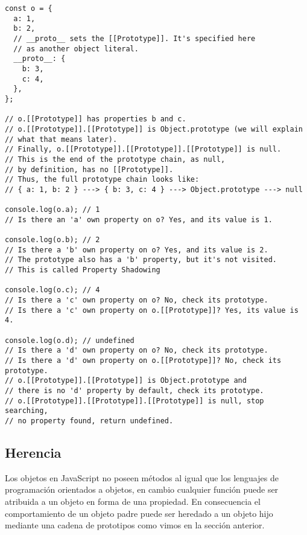 \documentclass{article}
\begin{document}
\begin{lstlisting}
const o = {
  a: 1,
  b: 2,
  // __proto__ sets the [[Prototype]]. It's specified here
  // as another object literal.
  __proto__: {
    b: 3,
    c: 4,
  },
};

// o.[[Prototype]] has properties b and c.
// o.[[Prototype]].[[Prototype]] is Object.prototype (we will explain
// what that means later).
// Finally, o.[[Prototype]].[[Prototype]].[[Prototype]] is null.
// This is the end of the prototype chain, as null,
// by definition, has no [[Prototype]].
// Thus, the full prototype chain looks like:
// { a: 1, b: 2 } ---> { b: 3, c: 4 } ---> Object.prototype ---> null

console.log(o.a); // 1
// Is there an 'a' own property on o? Yes, and its value is 1.

console.log(o.b); // 2
// Is there a 'b' own property on o? Yes, and its value is 2.
// The prototype also has a 'b' property, but it's not visited.
// This is called Property Shadowing

console.log(o.c); // 4
// Is there a 'c' own property on o? No, check its prototype.
// Is there a 'c' own property on o.[[Prototype]]? Yes, its value is 4.

console.log(o.d); // undefined
// Is there a 'd' own property on o? No, check its prototype.
// Is there a 'd' own property on o.[[Prototype]]? No, check its prototype.
// o.[[Prototype]].[[Prototype]] is Object.prototype and
// there is no 'd' property by default, check its prototype.
// o.[[Prototype]].[[Prototype]].[[Prototype]] is null, stop searching,
// no property found, return undefined.

\end{lstlisting}

\subsection*{Herencia}

Los objetos en JavaScript no poseen métodos al igual que los lenguajes de programación orientados  a objetos,
en cambio cualquier función puede ser atribuida a un objeto en forma de una propiedad. En consecuencia el
comportamiento de un objeto padre puede ser heredado a un objeto hijo mediante una cadena de prototipos como vimos
en la sección anterior.
\end{document}
